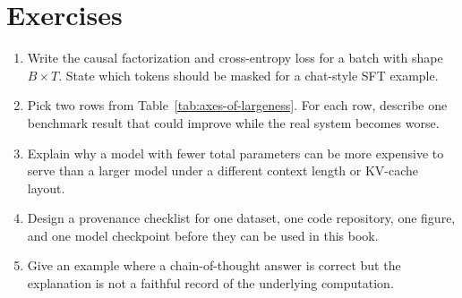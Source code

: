 \section{Exercises}
\label{sec:chapter-one-exercises}

\begin{enumerate}
\item Write the causal factorization and cross-entropy loss for a batch with shape $B \times T$. State which tokens should be masked for a chat-style SFT example.
\item Pick two rows from Table~\ref{tab:axes-of-largeness}. For each row, describe one benchmark result that could improve while the real system becomes worse.
\item Explain why a model with fewer total parameters can be more expensive to serve than a larger model under a different context length or KV-cache layout.
\item Design a provenance checklist for one dataset, one code repository, one figure, and one model checkpoint before they can be used in this book.
\item Give an example where a chain-of-thought answer is correct but the explanation is not a faithful record of the underlying computation.
\end{enumerate}
